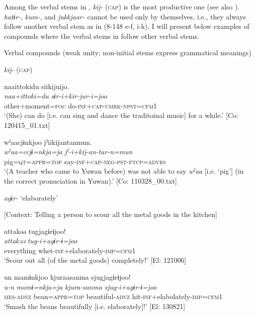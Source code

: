 Among the verbal stems in , \textit{kij-} (\textsc{cap}) is the most productive one (see also ). \textit{hatɨr-}, \textit{kum-}, and \textit{jukkjaar-} cannot be used only by themselves, i.e., they always follow another verbal stem as in (8-148 e-f, i-k). I will present below examples of compounds where the verbal stems in  follow other verbal stems.

\ea\label{ex:8-148}
  Verbal compounds (weak unity; non-initial stems express grammatical meanings)

  \textit{kij-} (\textsc{cap})

\ea
{\TM}
\glll  naa{\textbar}ittoki{\textbar}du  siikijuijo.\\
\textit{naa+ittoki=du}  \textit{sɨr-i+kir-jur-i=joo}\\
other+moment=\textsc{foc}  do-\textsc{inf}+\textsc{cap}-\textsc{umrk}-\textsc{npst}=\textsc{cfm1}\\
\glt ‘(She) can do [i.e. can sing and dance the traditoinal music] for a while.’ [Co: 120415\_01.txt]

\ex
{\TM}
\glll  wˀaacjɨnkjoo  jˀiikijantanmun.\\
\textit{wˀaa=ccjɨ=nkja=ja}  \textit{jˀ-i+kij-an-tar-n=mun}\\
pig=\textsc{qt}=\textsc{appr}=\textsc{top}  say-\textsc{inf}+\textsc{cap}-\textsc{neg}-\textsc{pst}-\textsc{ptcp}=\textsc{advrs}\\
\glt ‘(A teacher who came to Yuwan before) was not able to say \textit{wˀaa} [i.e. ‘pig’] (in the correct pronuciation in Yuwan).’ [Co: 110328\_00.txt]

  \textit{agɨr-} ‘elaborately’


\ex {}[Context: Telling a person to scour all the metal goods in the kitchen]

{\TM}
\glll  attakəə  tugjagɨrɨjoo!\\
\textit{attakəə}  \textit{tug-i+agɨr-ɨ=joo}\\
everything  whet-\textsc{inf}+elaborately-\textsc{imp}=\textsc{cfm1}\\
\glt ‘Scour out all (of the metal goods) completely!’ [El: 121006]

\ex
{\TM}
\glll  un  mamɨnkjoo  kjuraasanma  sjugjagɨrɨjoo!\\
\textit{u-n}  \textit{mamɨ=nkja=ja}  \textit{kjura-sanma}  \textit{sjug-i+agɨr-ɨ=joo}\\
\textsc{mes}-\textsc{adnz}  bean=\textsc{appr}=\textsc{top}  beautiful-\textsc{advz}  hit-\textsc{inf}+elabolately-\textsc{imp}=\textsc{cfm1}\\
\glt ‘Smash the beans beautifully [i.e. elaborately]!’ [El: 130821]

